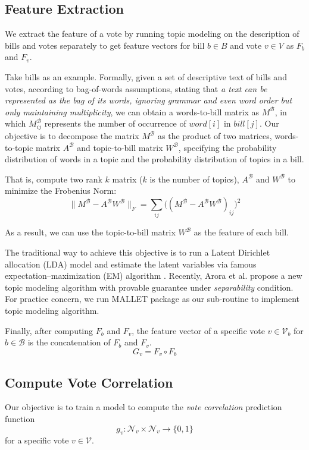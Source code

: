 \documentclass{article} %
\begin{document}
\subsection{Feature Extraction}    
    We extract the feature of a vote by running topic modeling on the description of bills and votes separately to get feature vectors for bill $b \in B$ and vote $v \in V$ as $F_b$ and $F_v$.
    
    Take bills as an example. Formally, given a set of descriptive text of bills and votes, according to bag-of-words assumptions, stating that {\em a text can be represented as the bag of its words, ignoring grammar and even word order but only maintaining multiplicity}, we can obtain a words-to-bill matrix as $M^{\mathcal B}$, in which $M_{ij}^{\mathcal B}$ represents the number of occurrence of $word[i]$ in $bill[j]$. Our objective is to decompose the matrix $M^{\mathcal B}$ as the product of two matrices, words-to-topic matrix $A^{\mathcal B}$ and topic-to-bill matrix $W^{\mathcal B}$, specifying the probability distribution of words in a topic and the probability distribution of topics in a bill. 
    
    That is, compute two rank $k$ matrix ($k$ is the number of topics), $A^{\mathcal B}$ and $W^{\mathcal B}$ to minimize the Frobenius Norm:
    \[
        \|M^{\mathcal B} - A^{\mathcal B} W^{\mathcal B}\|_F = \sum_{ij} \big((M^{\mathcal B} - A^{\mathcal B} W^{\mathcal B})_{ij}\big)^2
    \]
    
    
    As a result, we can use the topic-to-bill matrix $W^{\mathcal B}$ as the feature of each bill.
    
    The traditional way to achieve this objective is to run a Latent Dirichlet allocation (LDA) model \cite{blei2003latent} and estimate the latent variables via famous expectation–maximization (EM) algorithm \cite{dempster1977maximum}. Recently, Arora et al. \cite{conf/icml/AroraGHMMSWZ13} propose a new topic modeling algorithm with provable guarantee under {\em separability} condition. For practice concern, we run MALLET package \cite{graham2012getting} as our sub-routine to implement topic modeling algorithm.
     
    Finally, after computing $F_b$ and $F_v$, the feature vector of a specific vote $v \in \mathcal V_b$ for $b \in \mathcal B$ is the concatenation of $F_b$ and $F_v$.
    \[
        G_v = F_v \circ F_b
    \]
    
\subsection{Compute Vote Correlation}
Our objective is to train a model to compute the {\em vote correlation} prediction function 
\[
    g_v: \mathcal N_v \times \mathcal N_v \to \{0, 1\}
\] 
for a specific vote $v \in \mathcal V$. 
\end{document}
